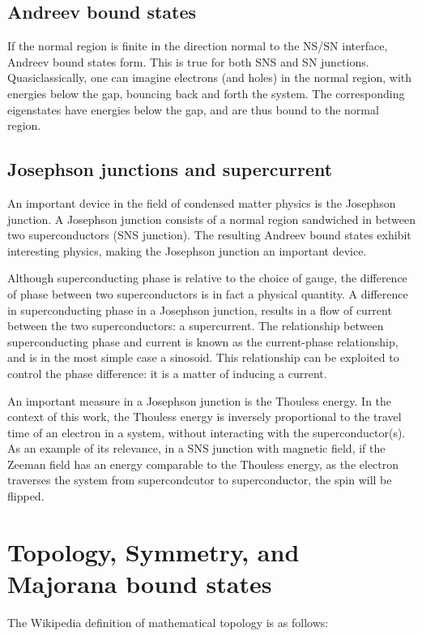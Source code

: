 	\subsection{Andreev bound states}
		If the normal region is finite in the direction normal to the NS/SN interface, Andreev bound states form.
		This is true for both SNS and SN junctions.
		Quasiclassically, one can imagine electrons (and holes) in the normal region, with energies below the gap, bouncing back and forth the system.
		The corresponding eigenstates have energies below the gap, and are thus bound to the normal region.

	\subsection{Josephson junctions and supercurrent}
		An important device in the field of condensed matter physics is the Josephson junction.
		A Josephson junction consists of a normal region sandwiched in between two superconductors (SNS junction).
		The resulting Andreev bound states exhibit interesting physics, making the Josephson junction an important device.

		Although superconducting phase is relative to the choice of gauge, the difference of phase between two superconductors is in fact a physical quantity.
		A difference in superconducting phase in a Josephson junction, results in a flow of current between the two superconductors: a supercurrent.
		The relationship between superconducting phase and current is known as the current-phase relationship, and is in the most simple case a sinosoid.
		This relationship can be exploited to control the phase difference: it is a matter of inducing a current.

		An important measure in a Josephson junction is the Thouless energy.
		In the context of this work, the Thouless energy is inversely proportional to the travel time of an electron in a system, without interacting with the superconductor(s).
		As an example of its relevance, in a SNS junction with magnetic field, if the Zeeman field has an energy comparable to the Thouless energy, as the electron traverses the system from supercondcutor to superconductor, the spin will be flipped.
		
\section{Topology, Symmetry, and Majorana bound states}

	The Wikipedia definition of mathematical topology is as follows:
	
